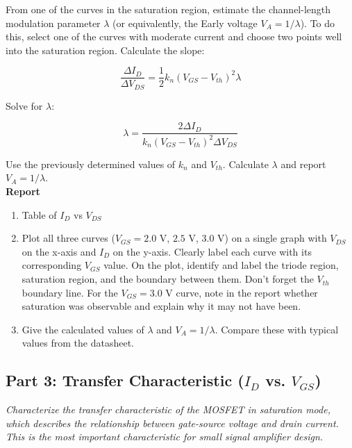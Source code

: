 \documentclass[10pt]{article}
\begin{document}
From one of the curves in the saturation region, estimate the channel-length modulation parameter $\lambda$ (or equivalently, the Early voltage $V_A = 1/\lambda$). To do this, select one of the curves with moderate current and choose two points well into the saturation region. Calculate the slope: 

\begin{equation}
    \frac{\Delta I_D}{\Delta V_{DS}} = \frac{1}{2} k_n (V_{GS} - V_{th})^2 \lambda
\end{equation}

Solve for $\lambda$:

\begin{equation}
    \lambda = \frac{2 \Delta I_D}{k_n (V_{GS} - V_{th})^2 \Delta V_{DS}}
\end{equation}

Use the previously determined values of $k_n$ and $V_{th}$.  Calculate $\lambda$ and report $V_A = 1/\lambda$.\\


\textbf{Report}
\begin {enumerate}
    \item Table of $I_D$ vs $V_{DS}$
    \item Plot all three curves ($V_{GS} = 2.0$ V, $2.5$ V, $3.0$ V) on a single graph with $V_{DS}$ on the x-axis and $I_D$ on the y-axis. Clearly label each curve with its corresponding $V_{GS}$ value. On the plot, identify and label the triode region, saturation region, and the boundary between them. Don't forget the $V_{th}$ boundary line. For the $V_{GS} = 3.0$ V curve, note in the report whether saturation was observable and explain why it may not have been.
    \item Give the calculated values of $\lambda$ and $V_A = 1/\lambda$. Compare these with typical values from the datasheet.\\
\end{enumerate}



\subsection{Part 3: Transfer Characteristic ($I_D$ vs. $V_{GS}$)}
\emph{Characterize the transfer characteristic of the MOSFET in saturation mode, which describes the relationship between gate-source voltage and drain current. This is the most important characteristic for small signal amplifier design.}\\
\end{document}
